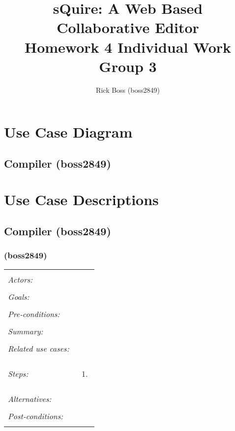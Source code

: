 \documentclass[11pt]{article}
\title{sQuire: A Web Based Collaborative Editor\\Homework 4 Individual Work\\Group 3}
\author{Rick Boss (boss2849)}
\begin{document}
\maketitle

\newpage
\tableofcontents
\newpage

\section{Use Case Diagram}
\subsection{Compiler (boss2849)}

\section{Use Case Descriptions}
\subsection{Compiler (boss2849)}
\subsubsection{ (boss2849)}
\begin{tabular}{ p{2cm} p{12cm} }
 \hline
 \\
 \textit{Actors:} & \\ 
 \\
 \textit{Goals:} & \\
 \\
 \textit{Pre-conditions:} & \\
 \\
 \textit{Summary:} & \\
 \\
 \textit{Related use cases:} & \\ 
 \\
 \textit{Steps:} & \begin{enumerate}
  \item 
 \end{enumerate} \\
 \\
 \textit{Alternatives:} & \\
 \\
 \textit{Post-conditions:} & \\
 \\
\hline
\end{tabular}
\end{document}
